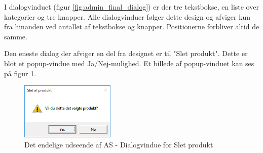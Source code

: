 I dialogvinduet (figur \ref{fig:admin_final_dialog}) er der tre tekstbokse, en liste over kategorier og tre knapper. Alle dialogvinduer følger dette design og afviger kun fra hinanden ved antallet af tekstbokse og knapper. Positionerne forbliver altid de samme.

Den eneste dialog der afviger en del fra designet er til "Slet produkt". Dette er blot et popup-vindue med Ja/Nej-mulighed. Et billede af popup-vinduet kan ses på figur \ref{fig:admin_final_sletprodukt}.

\begin{figure}[H]
	\centering
	\includegraphics[width=0.4\textwidth]{Systemdesign/backend/Images/AdminDesignSletProdukt}
	\caption{Det endelige udseende af \gls{AS} - Dialogvindue for Slet produkt}
	\label{fig:admin_final_sletprodukt}
\end{figure}